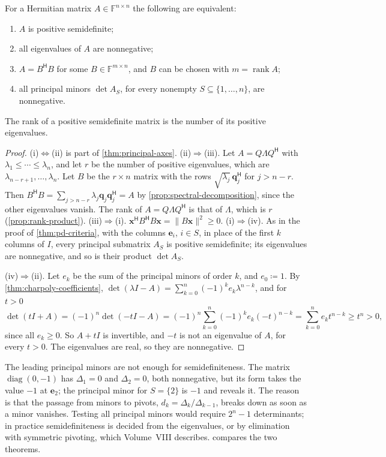 \begin{theorem}
\label{thm:psd-criteria}
For a Hermitian matrix $A\in\mathbb F^{n\times n}$ the following are equivalent:
\begin{enumerate}
\item $A$ is positive semidefinite;
\item all eigenvalues of $A$ are nonnegative;
\item $A=B^{\mathsf H}B$ for some $B\in\mathbb F^{m\times n}$, and $B$ can be chosen with $m=\operatorname{rank}A$;
\item all principal minors $\det A_S$, for every nonempty $S\subseteq\{1,\ldots,n\}$, are nonnegative.
\end{enumerate}
The rank of a positive semidefinite matrix is the number of its positive eigenvalues.
\end{theorem}

\begin{proof}
(i)$\Leftrightarrow$(ii) is part of \cref{thm:principal-axes}. (ii)$\Rightarrow$(iii). Let $A=Q\Lambda Q^{\mathsf H}$ with $\lambda_1\le\cdots\le\lambda_n$, and let $r$ be the number of positive eigenvalues, which are $\lambda_{n-r+1},\ldots,\lambda_n$. Let $B$ be the $r\times n$ matrix with the rows $\sqrt{\lambda_j}\,\mathbf q_j^{\mathsf H}$ for $j>n-r$. Then $B^{\mathsf H}B=\sum_{j>n-r}\lambda_j\mathbf q_j\mathbf q_j^{\mathsf H}=A$ by \cref{prop:spectral-decomposition}, since the other eigenvalues vanish. The rank of $A=Q\Lambda Q^{\mathsf H}$ is that of $\Lambda$, which is $r$ (\cref{prop:rank-product}). (iii)$\Rightarrow$(i). $\mathbf x^{\mathsf H}B^{\mathsf H}B\mathbf x=\|B\mathbf x\|^2\ge0$. (i)$\Rightarrow$(iv). As in the proof of \cref{thm:pd-criteria}, with the columns $\mathbf e_i$, $i\in S$, in place of the first $k$ columns of $I$, every principal submatrix $A_S$ is positive semidefinite; its eigenvalues are nonnegative, and so is their product $\det A_S$.

(iv)$\Rightarrow$(ii). Let $e_k$ be the sum of the principal minors of order $k$, and $e_0\coloneqq1$. By \cref{thm:charpoly-coefficients}, $\det(\lambda I-A)=\sum_{k=0}^n(-1)^ke_k\lambda^{n-k}$, and for $t>0$
\[
\det(tI+A)=(-1)^n\det(-tI-A)=(-1)^n\sum_{k=0}^n(-1)^ke_k(-t)^{n-k}=\sum_{k=0}^ne_kt^{n-k}\ge t^n>0 ,
\]
since all $e_k\ge0$. So $A+tI$ is invertible, and $-t$ is not an eigenvalue of $A$, for every $t>0$. The eigenvalues are real, so they are nonnegative.
\end{proof}

The leading principal minors are not enough for semidefiniteness. The matrix $\operatorname{diag}(0,-1)$ has $\Delta_1=0$ and $\Delta_2=0$, both nonnegative, but its form takes the value $-1$ at $\mathbf e_2$; the principal minor for $S=\{2\}$ is $-1$ and reveals it. The reason is that the passage from minors to pivots, $d_k=\Delta_k/\Delta_{k-1}$, breaks down as soon as a minor vanishes. Testing all principal minors would require $2^n-1$ determinants; in practice semidefiniteness is decided from the eigenvalues, or by elimination with symmetric pivoting, which Volume~VIII describes.  compares the two theorems.

